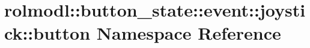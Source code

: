 \hypertarget{namespacerolmodl_1_1button__state_1_1event_1_1joystick_1_1button}{}\section{rolmodl\+::button\+\_\+state\+::event\+::joystick\+::button Namespace Reference}
\label{namespacerolmodl_1_1button__state_1_1event_1_1joystick_1_1button}
